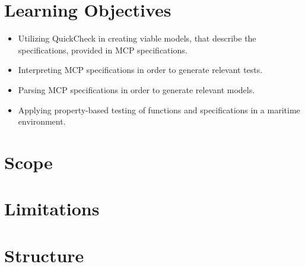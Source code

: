 \section{Learning Objectives}

\begin{itemize}
	\item Utilizing QuickCheck in creating viable models, that describe the specifications, provided in MCP specifications.
	\item Interpreting MCP specifications in order to generate relevant tests.
	\item Parsing MCP specifications in order to generate relevant models.
	\item Applying property-based testing of functions and specifications in a maritime environment.
\end{itemize}

\section{Scope}
\TODO{ }

\section{Limitations}
\TODO{ }

\section{Structure}
\TODO{ }

